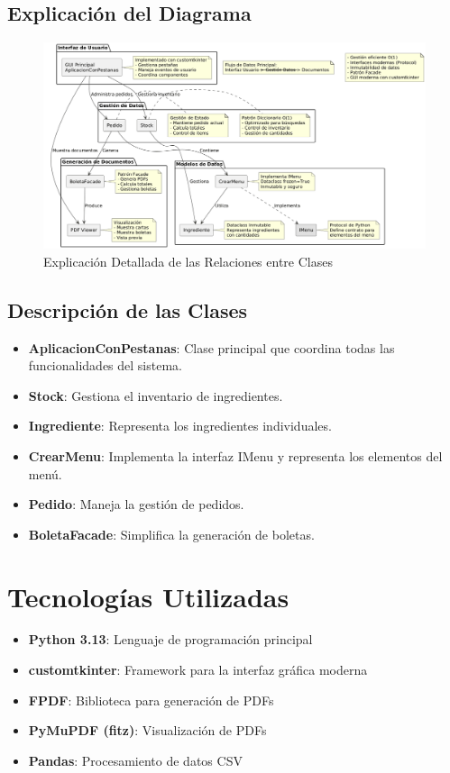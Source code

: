 \documentclass[12pt,letterpaper]{article}
\begin{document}
\subsection{Explicación del Diagrama}
\begin{figure}[H]
    \centering
    \includegraphics[width=\textwidth]{./images/explicacion_diagrama.png}
    \caption{Explicación Detallada de las Relaciones entre Clases}\label{fig:explicacion-diagrama}
\end{figure}

\subsection{Descripción de las Clases}
\begin{itemize}
    \item \textbf{AplicacionConPestanas}: Clase principal que coordina todas las funcionalidades del sistema.
    \item \textbf{Stock}: Gestiona el inventario de ingredientes.
    \item \textbf{Ingrediente}: Representa los ingredientes individuales.
    \item \textbf{CrearMenu}: Implementa la interfaz IMenu y representa los elementos del menú.
    \item \textbf{Pedido}: Maneja la gestión de pedidos.
    \item \textbf{BoletaFacade}: Simplifica la generación de boletas.
\end{itemize}

\section{Tecnologías Utilizadas}
\begin{itemize}
    \item \textbf{Python 3.13}: Lenguaje de programación principal
    \item \textbf{customtkinter}: Framework para la interfaz gráfica moderna
    \item \textbf{FPDF}: Biblioteca para generación de PDFs
    \item \textbf{PyMuPDF (fitz)}: Visualización de PDFs
    \item \textbf{Pandas}: Procesamiento de datos CSV
\end{itemize}
\end{document}
